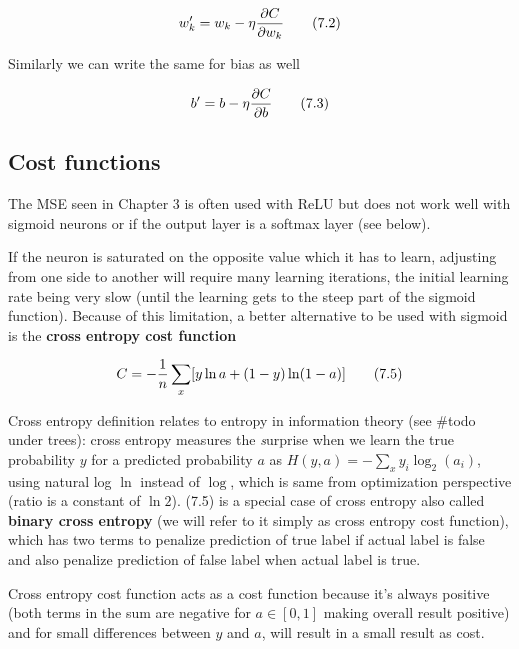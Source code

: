\begin{equation}w_k' = w_k - \eta { \partial C \over \partial w_k}\tag{7.2}\end{equation}

Similarly we can write the same for bias as well

\begin{equation}b' = b - \eta { \partial C \over \partial b}\tag{7.3}\end{equation}

\subsection{Cost functions}

The MSE seen in Chapter 3 is often used with ReLU but does not work well with sigmoid neurons or if the output layer is a softmax layer (see below).

If the neuron is saturated on the opposite value which it has to learn, adjusting from one side to another will require many learning iterations, the initial learning rate being very slow (until the learning gets to the steep part of the sigmoid function). Because of this limitation, a better alternative to be used with sigmoid is the \textbf{cross entropy cost function}

\begin{equation}C = -{1 \over n}\sum_x[y \ln a + (1 - y) \ln (1-a)] \tag{7.5}\end{equation}

Cross entropy definition relates to entropy in information theory (see \#todo under trees): cross entropy measures the \textit{s}urprise\textit{ }when we learn the true probability \(y\) for a predicted probability \(a\) as \(H(y,a) = -\sum_xy_i\log_2(a_i)\), using natural log \(\ln\) instead of \(\log\), which is same from optimization perspective (ratio is a constant of \(\ln 2\)). (7.5) is a special case of cross entropy also called \textbf{binary cross entropy} (we will refer to it simply as cross entropy cost function), which has two terms to penalize prediction of true label if actual label is false and also penalize prediction of false label when actual label is true.

Cross entropy cost function acts as a cost function because it's always positive (both terms in the sum are negative for \(a \in [0, 1]\) making overall result positive) and for small differences between \(y\) and \(a\), will result in a small result as cost.

